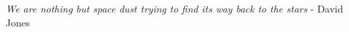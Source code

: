 \chapter*{  }
\vspace*{220px}
\begin{center}
\textit{\Large{We are nothing but space dust trying to find its way back to the stars}} \large{- David Jones}
\end{center}

